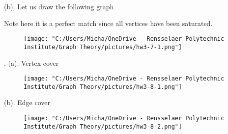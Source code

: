 \documentclass[12pt]{article}
\begin{document}
	\newpage
	(b).
		Let us draw the following graph
		
		Note here it is a perfect match since all vertices have been saturated.
	\begin{figure}[h]
		\hfil\texttt{[image: "C:/Users/Micha/OneDrive - Rensselaer Polytechnic Institute/Graph Theory/pictures/hw3-7-1.png"]}\\
	\end{figure}


	
	.
	(a). Vertex cover\\
	\begin{figure}[h]
		\hfil\texttt{[image: "C:/Users/Micha/OneDrive - Rensselaer Polytechnic Institute/Graph Theory/pictures/hw3-8-1.png"]}\\
	\end{figure}
	\newpage
	(b). Edge cover\\
	\begin{figure}[h]
		\hfil\texttt{[image: "C:/Users/Micha/OneDrive - Rensselaer Polytechnic Institute/Graph Theory/pictures/hw3-8-2.png"]}\\
	\end{figure}
\end{document}
